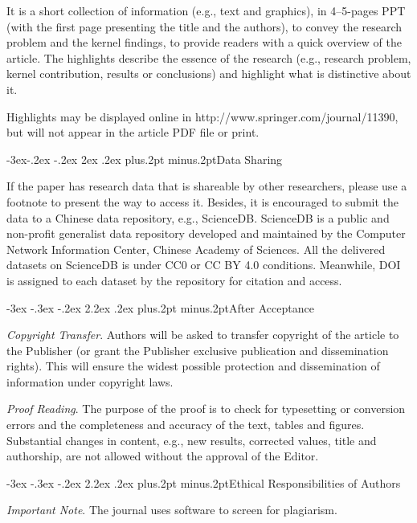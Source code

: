\documentclass[twoside]{article}
\makeatletter
\def\section{\@startsection{section}{1}{\z@}%
 {-3ex \@plus -.3ex \@minus -.2ex}%
 {2.2ex \@plus.2ex}%
{\normalfont\normalsize\protect\baselineskip=14.5pt plus.2pt minus.2pt\bfseries}}
\def\subsection{\@startsection{subsection}{2}{\z@}%
 {-3ex\@plus -.2ex \@minus -.2ex}%
 {2ex \@plus.2ex}%
{\normalfont\normalsize\protect\baselineskip=12.5pt plus.2pt minus.2pt\bfseries}}
\makeatother
\begin{document}
\begin{multicols}{2}
It is a short collection of information (e.g., text and graphics), in 4--5-pages PPT (with the first page presenting the title and the authors), to convey the research problem and the kernel findings, to provide readers with a quick overview of the article. The highlights describe the essence of the research (e.g., research problem, kernel contribution, results or conclusions) and highlight what is distinctive about it.

Highlights may be displayed online in http://www.springer.com/journal/11390, but will not appear in the article PDF file or print.

\subsection{Data Sharing}

If the paper has research data that is shareable by other researchers, please use a footnote to present the way to access it. Besides, it is encouraged to submit the data to a Chinese data repository, e.g., ScienceDB. ScienceDB is a public and non-profit generalist data repository developed and maintained by the Computer Network Information Center, Chinese Academy of Sciences. All the delivered datasets on ScienceDB is under CC0 or CC BY 4.0 conditions. Meanwhile, DOI is assigned to each dataset by the repository for citation and access.

\section{After Acceptance}

{\it Copyright Transfer}. Authors will be asked to transfer copyright of the article to the Publisher (or grant the Publisher exclusive publication and dissemination rights). This will ensure the widest possible protection and dissemination of information under copyright laws.

{\it Proof Reading}. The purpose of the proof is to check for typesetting or conversion errors and the completeness and accuracy of the text, tables and figures. Substantial changes in content, e.g., new results, corrected values, title and authorship, are not allowed without the approval of the Editor.

\section{Ethical Responsibilities of Authors}

{\it Important Note}. The journal uses software to screen for plagiarism.


\end{multicols}
\end{document}

